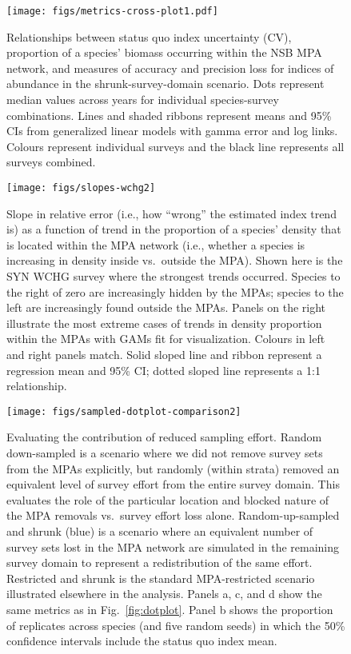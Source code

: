 \documentclass[12pt]{article}
\begin{document}
\begin{figure}[htb]
  \centering
  \texttt{[image: figs/metrics-cross-plot1.pdf]}
  \caption{Relationships between status quo index uncertainty (CV), proportion of a species' biomass occurring within the NSB MPA network, and measures of accuracy and precision loss for indices of abundance in the shrunk-survey-domain scenario. Dots represent median values across years for individual species-survey combinations. Lines and shaded ribbons represent means and 95\% CIs from generalized linear models with gamma error and log links. Colours represent individual surveys and the black line represents all surveys combined.}
  \label{fig:covariates}
\end{figure}

\clearpage

\begin{figure}[htb]
    \centering
    \texttt{[image: figs/slopes-wchg2]}
    \caption{Slope in relative error (i.e., how ``wrong'' the estimated index trend is) as a function of trend in the proportion of a species' density that is located within the MPA network (i.e., whether a species is increasing in density inside vs.\ outside the MPA). Shown here is the SYN WCHG survey where the strongest trends occurred. Species to the right of zero are increasingly hidden by the MPAs; species to the left are increasingly found outside the MPAs. Panels on the right illustrate the most extreme cases of trends in density proportion within the MPAs with GAMs fit for visualization. Colours in left and right panels match. Solid sloped line and ribbon represent a regression mean and 95\% CI; dotted sloped line represents a 1:1 relationship.}
    \label{fig:slopes}
\end{figure}

\clearpage

\begin{figure}[htb]
    \centering
    \texttt{[image: figs/sampled-dotplot-comparison2]}
    \caption{Evaluating the contribution of reduced sampling effort. Random down-sampled is a scenario where we did not remove survey sets from the MPAs explicitly, but randomly (within strata) removed an equivalent level of survey effort from the entire survey domain. This evaluates the role of the particular location and blocked nature of the MPA removals vs.\ survey effort loss alone. Random-up-sampled and shrunk (blue) is a scenario where an equivalent number of survey sets lost in the MPA network are simulated in the remaining survey domain to represent a redistribution of the same effort. Restricted and shrunk is the standard MPA-restricted scenario illustrated elsewhere in the analysis. Panels a, c, and d show the same metrics as in Fig.~\ref{fig:dotplot}. Panel b shows the proportion of replicates across species (and five random seeds) in which the 50\% confidence intervals include the status quo index mean.}
    \label{fig:sampling}
\end{figure}
\end{document}
